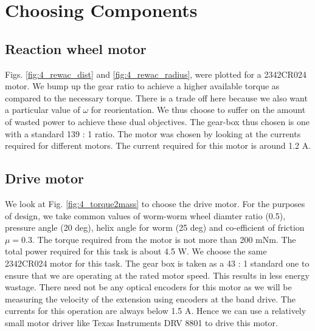 \section{Choosing Components}
\subsection*{Reaction wheel motor}
Figs. \ref{fig:4_rewac_dist} and \ref{fig:4_rewac_radius}, were plotted for a 2342CR024 motor. We bump up
the gear ratio to achieve a higher available torque as compared to the necessary torque. There is a trade off
here because we also want a particular value of $\omega$ for reorientation. We thus choose to suffer on the
amount of wasted power to achieve these dual objectives. The gear-box thus chosen is one with a standard 139 : 1 ratio. The motor was chosen by looking at the currents required for different motors. The current required
for this motor is around 1.2 A.

\subsection*{Drive motor}
We look at Fig. \ref{fig:4_torque2mass} to choose the drive motor. For the purposes of design, we take common values of worm-worm wheel diamter ratio (0.5), pressure angle (20 deg), helix angle for worm (25 deg) and co-efficient
of friction $\mu = 0.3$. The torque required from the motor is not more than 200 mNm. The total power required
for this task is about 4.5 W. We choose the same 2342CR024 motor for this task. The gear box is taken as a
43 : 1
standard one to ensure that we are operating at the rated motor speed. This results in less energy wastage. There need not be any optical encoders for this motor as we will be measuring the velocity of the extension using encoders at the band drive. The currents for this operation are always below 1.5 A. Hence we can use a relatively small motor driver like Texas Instruments DRV 8801 to drive this motor.


